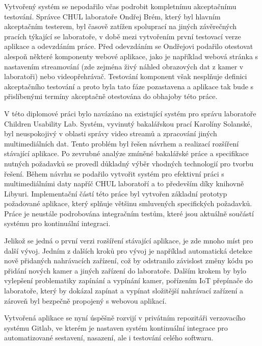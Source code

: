 \documentclass[thesis=M,czech]{FITthesis}[2012/06/26]
\begin{document}
	Vytvořený systém se nepodařilo včas podrobit kompletnímu akceptačnímu testování. Správce CHUL laboratoře Ondřej Brém, který byl hlavním akceptačním testerem, byl časově zatížen spoluprací na jiných závěrečných pracích týkající se laboratoře, v době mezi vytvořením první testovací verze aplikace a odevzdáním práce. Před odevzdáním se Ondřejovi podařilo otestovat alespoň některé komponenty webové aplikace, jako je například webová stránka s nastavením streamování (zde zejména živý náhled obrazových dat z kamer v laboratoři) nebo videopřehrávač. Testování komponent však nesplňuje definici akceptačního testování a proto byla tato fáze pozastavena a aplikace tak bude s přislíbenými termíny akceptačně otestována do obhajoby této práce.
		
	
\begin{conclusion}
V této diplomové práci bylo navázáno na existující systém pro správu laboratoře Children Usability Lab. Systém, vyvinutý bakalářskou prací Karolíny Solanské, byl neuspokojivý v oblasti správy video streamů a zpracování jiných multimediálních dat. Tento problém byl řešen návrhem a realizací rozšíření stávající aplikace. Po zevrubné analýze zmíněné bakalářské práce a specifikace nutných požadavků se provedl důkladný výběr vhodných technologií pro tvorbu řešení. Během návrhu se podařilo vytvořit systém pro efektivní práci s multimediálními daty napříč CHUL laboratoří a to především díky knihovně Libyuri. Implementační částí této práce byl vytvořen základní prototyp požadované aplikace, který splňuje většinu smluvených specifických požadavků. Práce je neustále podrobována integračním testům, které jsou aktuálně součástí systému pro kontinuální integraci.

	Jelikož se jedná o první verzi rozšíření stávající aplikace, je zde mnoho míst pro další vývoj. Jedním z dalších kroků pro vývoj je například automatická detekce nově přidaných nahrávacích zařízení, což by odstranilo závislost změny kódu po přidání nových kamer a jiných zařízení do laboratoře. Dalším krokem by bylo vylepšení problematiky zapínání a vypínání kamer, pořízením IoT přepínače do laboratoře, který by dokázal zapínat a vypínat složitější nahrávací zařízení a zároveň byl bezpečně propojený s webovou aplikací.
	
	Vytvořená aplikace se nyní úspěšně rozvijí v privátním repozitáři verzovacího systému Gitlab, ve kterém je nastaven systém kontinuální integrace pro automatizované sestavení, nasazení, ale i testování celého softwaru.
\end{conclusion}
\end{document}
